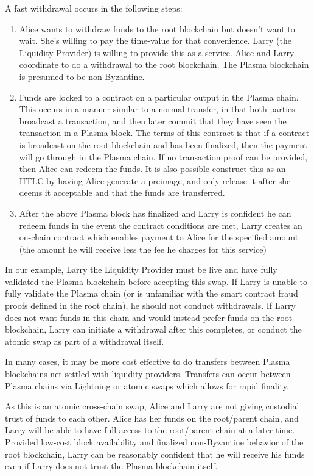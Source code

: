 \documentclass[letterpaper, 11pt]{article}
\begin{document}
A fast withdrawal occurs in the following steps:
\begin{enumerate}
	\item
		Alice wants to withdraw funds to the root blockchain but doesn't
		want to wait. She's willing to pay the time-value for that
		convenience. Larry (the Liquidity Provider) is willing to
		provide this as a service. Alice and Larry coordinate to do a
		withdrawal to the root blockchain. The Plasma blockchain is
		presumed to be non-Byzantine.
	\item
		Funds are locked to a contract on a particular output in the
		Plasma chain. This occurs in a manner similar to a normal
		transfer, in that both parties broadcast a transaction, and then
		later commit that they have seen the transaction in a Plasma
		block. The terms of this contract is that if a contract is
		broadcast on the root blockchain and has been finalized, then
		the payment will go through in the Plasma chain. If no
		transaction proof can be provided, then Alice can redeem the
		funds. It is also possible construct this as an HTLC by having
		Alice generate a preimage, and only release it after she deems
		it acceptable and that the funds are transferred.
	\item
		After the above Plasma block has finalized and Larry is
		confident he can redeem funds in the event the contract
		conditions are met, Larry creates an on-chain contract which
		enables payment to Alice for the specified amount (the amount he
		will receive less the fee he charges for this service)
\end{enumerate}

In our example, Larry the Liquidity Provider must be live and have fully
validated the Plasma blockchain before accepting this swap. If Larry is unable
to fully validate the Plasma chain (or is unfamiliar with the smart contract
fraud proofs defined in the root chain), he should not conduct withdrawals. If
Larry does not want funds in this chain and would instead prefer funds on the
root blockchain, Larry can initiate a withdrawal after this completes, or
conduct the atomic swap as part of a withdrawal itself.

In many cases, it may be more cost effective to do transfers between Plasma
blockchains net-settled with liquidity providers. Transfers can occur between
Plasma chains via Lightning or atomic swaps which allows for rapid finality.

As this is an atomic cross-chain swap, Alice and Larry are not giving custodial
trust of funds to each other. Alice has her funds on the root/parent chain, and
Larry will be able to have full access to the root/parent chain at a later time.
Provided low-cost block availability and finalized non-Byzantine behavior of the
root blockchain, Larry can be reasonably confident that he will receive his
funds even if Larry does not trust the Plasma blockchain itself.
\end{document}
